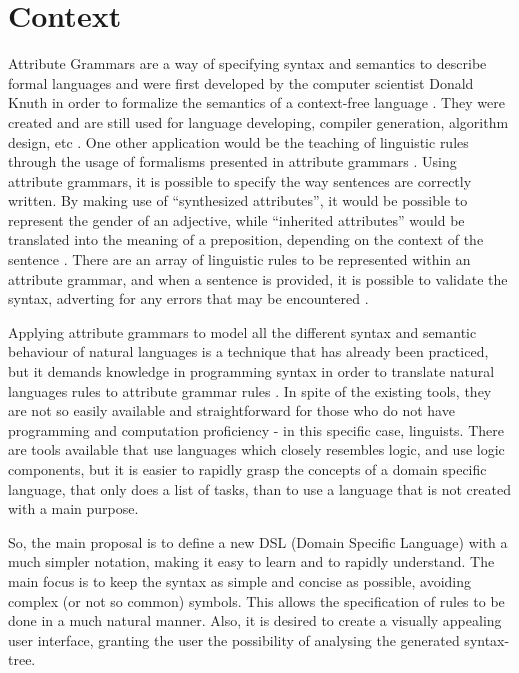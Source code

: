 \section{Context}
Attribute Grammars are a way of specifying syntax and semantics to describe formal languages \cite{hafiz_2011} and were first developed by the computer scientist Donald Knuth in order to formalize the semantics of a context-free language \cite{slonneger_1995}. They were created and are still used for language developing, compiler generation, algorithm design, etc \cite{thirunarayan_2009}. One other application would be the teaching of linguistic rules through the usage of formalisms presented in attribute grammars \cite{horakova_2014}. Using attribute grammars, it is possible to specify the way sentences are correctly written. By making use of ``synthesized attributes'', it would be possible to represent the gender of an adjective, while ``inherited attributes'' would be translated into the meaning of a preposition, depending on the context of the sentence \cite{donald_1990}.
There are an array of linguistic rules to be represented within an attribute grammar, and when a sentence is provided, it is possible to validate the syntax, adverting for any errors that may be encountered \cite{barros_2017}.

Applying attribute grammars to model all the different syntax and semantic behaviour of natural languages is a technique that has already been practiced, but it demands knowledge in programming syntax in order to translate natural languages rules to attribute grammar rules \cite{hafiz_2011}. In spite of the existing tools, they are not so easily available and straightforward for those who do not have programming and computation proficiency - in this specific case, linguists. There are tools available that use languages which closely resembles logic, and use logic components, but it is easier to rapidly grasp the concepts of a domain specific language, that only does a list of tasks, than to use a language that is not created with a main purpose.
    
So, the main proposal is to define a new \textsc{DSL} (Domain Specific Language) with a much simpler notation, making it easy to learn and to rapidly understand. The main focus is to keep the syntax as simple and concise as possible, avoiding complex (or not so common) symbols. This allows the specification of rules to be done in a much natural manner. Also, it is desired to create a visually appealing user interface, granting the user the possibility of analysing the generated syntax-tree.


